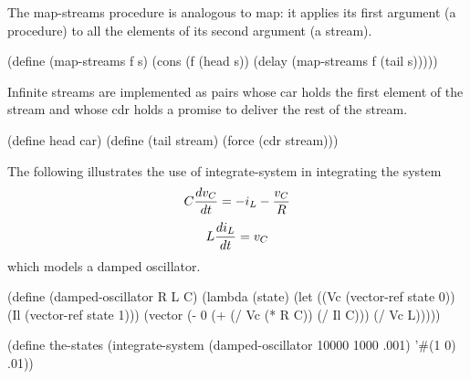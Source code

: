 The {\cf map-streams} procedure is analogous to {\cf map}: it applies its first
argument (a procedure) to all the elements of its second argument (a
stream).

\begin{schemenoindent}
(define (map-streams f s)
  (cons (f (head s))
        (delay (map-streams f (tail s)))))
\end{schemenoindent}

Infinite streams are implemented as pairs whose car holds the first
element of the stream and whose cdr holds a promise to deliver the rest
of the stream.

\begin{schemenoindent}
(define head car)
(define (tail stream)
  (force (cdr stream)))
\end{schemenoindent}

\bigskip
The following illustrates the use of {\cf integrate-system} in
integrating the system
$$ C {dv_C \over dt} = -i_L - {v_C \over R}$$
$$ L {di_L \over dt} = v_C$$
which models a damped oscillator.

\begin{schemenoindent}
(define (damped-oscillator R L C)
  (lambda (state)
    (let ((Vc (vector-ref state 0))
          (Il (vector-ref state 1)))
      (vector (- 0 (+ (/ Vc (* R C)) (/ Il C)))
              (/ Vc L)))))

(define the-states
  (integrate-system
     (damped-oscillator 10000 1000 .001)
     '\#(1 0)
     .01))
\end{schemenoindent}


